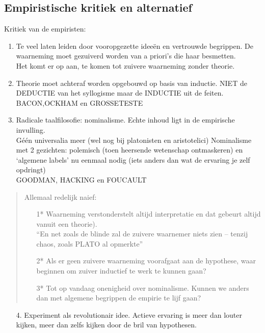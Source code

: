 \documentclass[11pt,a4paper]{article}
\begin{document}
\subsection{Empiristische kritiek en alternatief}
Kritiek van de empiristen:
\begin{enumerate}
\item Te veel laten leiden door vooropgezette ideeën en vertrouwde begrippen. De waarneming moet gezuiverd worden van a priori's die haar besmetten.
\\Het komt er op aan, te komen tot zuivere waarneming zonder theorie.
\item Theorie moet achteraf worden opgebouwd op basis van inductie.
NIET de DEDUCTIE van het syllogisme maar de INDUCTIE uit de feiten.
\\
BACON,OCKHAM en GROSSETESTE
\item Radicale taalfilosofie: nominalisme. Echte inhoud ligt in de empirische invulling. 
\\
G\'e\'en universalia meer (wel nog bij platonisten en aristotelici)
Nominalisme met 2 gezichten: polemisch (toen heersende wetenschap ontmaskeren) en ‘algemene labels’ nu eenmaal nodig (iets anders dan wat de ervaring je zelf opdringt)
\\
GOODMAN, HACKING en FOUCAULT
\end{enumerate}
\begin{quote}
Allemaal redelijk naief:
\begin{enumerate}
\item[1*] Waarneming verstonderstelt altijd interpretatie en dat gebeurt altijd vanuit een theorie).
\\
“En net zoals de blinde zal de zuivere waarnemer niets zien – tenzij chaos, zoals PLATO al opmerkte”
\item[2*] Als er geen zuivere waarneming voorafgaat aan de hypothese, waar beginnen om zuiver inductief te werk te kunnen gaan?
\item[3*] Tot op vandaag onenigheid over nominalisme. Kunnen we anders dan met algemene begrippen de empirie te lijf gaan?
\end{enumerate}
\end{quote}
\begin{enumerate}
 \item[4.] Experiment als revolutionair idee. Actieve ervaring is meer dan louter kijken, meer dan zelfs kijken door de bril van hypothesen.
\end{enumerate}
\end{document}
